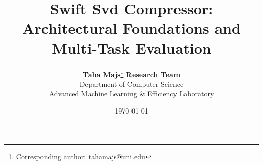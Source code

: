 \title{\textbf{Swift Svd Compressor: Architectural Foundations and Multi-Task Evaluation}}

\author{
  \textbf{Taha Majs}\thanks{Corresponding author: tahamajs@uni.edu} \quad \textbf{Research Team} \\
  Department of Computer Science \\
  Advanced Machine Learning \& Efficiency Laboratory
}

\date{\today}
